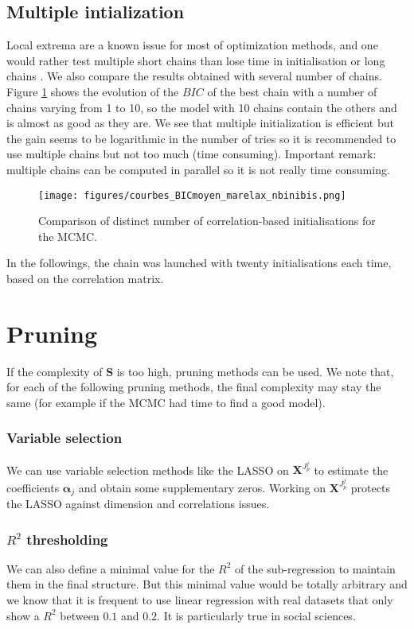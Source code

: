 \documentclass[12pt,a4paper]{report}
\begin{document}
		\subsection{Multiple intialization}	
		Local extrema are a known issue for most of optimization methods, and one would rather test multiple short chains than lose time in initialisation or long chains \cite{gilks1996markov}. 
		We also compare the results obtained with several number of chains. Figure \ref{nbini} shows the evolution of the $BIC$ of the best chain with a number of chains varying from 1 to 10, so the model with 10 chains contain the others and is almost as good as they are. We see that multiple initialization is efficient but the gain seems to be logarithmic in the number of tries so it is recommended to use multiple chains but not too much (time consuming). Important remark: multiple chains can be computed in parallel so it is not really time consuming.		
			
	\begin{center}
	\begin{figure}[h!]
	\centering
		\texttt{[image: figures/courbes\_BICmoyen\_marelax\_nbinibis.png]} 
		\caption{Comparison of distinct number of correlation-based initialisations for the MCMC.}\label{nbini}
	\end{figure}
	\end{center}
		In the followings, the chain was launched with twenty initialisations each time, based on the correlation matrix.

	\section{Pruning}
		If the complexity of $\boldsymbol{S}$ is too high, pruning methods can be used. We note that, for each of the following pruning methods, the final complexity may stay the same (for example if the MCMC had time to find a good model).
		\subsubsection{Variable selection}
			We can use variable selection methods like the LASSO on $\boldsymbol{X}^{J_p^j}$ to estimate the coefficients $\boldsymbol{\alpha}_j$ and obtain some supplementary zeros. Working on $\boldsymbol{X}^{J_p^j}$ protects the LASSO against dimension and correlations issues.
		\subsubsection{$R^2$ thresholding }
			We can also define a minimal value for the $R^2$ of the sub-regression to maintain them in the final structure. But this minimal value would be totally arbitrary and we know that it is frequent to use linear regression with real datasets that only show a $R^2$ between $0.1$ and $0.2$. It is particularly true in social sciences.
\end{document}

